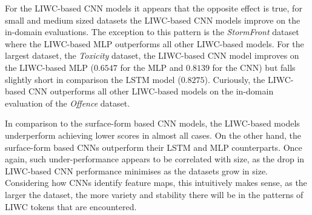 For the LIWC-based CNN models it appears that the opposite effect is true, for small and medium sized datasets the LIWC-based CNN models improve on the in-domain evaluations.
The exception to this pattern is the \textit{StormFront} dataset where the LIWC-based MLP outperforms all other LIWC-based models.
For the largest dataset, the \textit{Toxicity} dataset, the LIWC-based CNN model improves on the LIWC-based MLP ($0.6547$ for the MLP and $0.8139$ for the CNN) but falls slightly short in comparison the LSTM model ($0.8275$).
Curiously, the LIWC-based CNN outperforms all other LIWC-based models on the in-domain evaluation of the \textit{Offence} dataset.

In comparison to the surface-form based CNN models, the LIWC-based models underperform achieving lower scores in almost all cases. On the other hand, the surface-form based CNNs outperform their LSTM and MLP counterparts. Once again, such under-performance appears to be correlated with size, as the drop in LIWC-based CNN performance minimises as the datasets grow in size.
Considering how CNNs identify feature maps, this intuitively makes sense, as the larger the dataset, the more variety and stability there will be in the patterns of LIWC tokens that are encountered.

